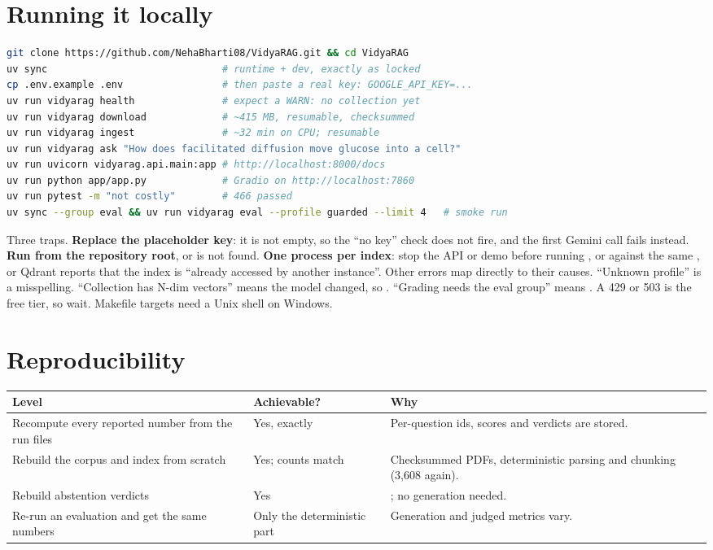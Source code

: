 \section{Running it locally}
\label{sec:setup}

\begin{lstlisting}[language=bash]
git clone https://github.com/NehaBharti08/VidyaRAG.git && cd VidyaRAG
uv sync                              # runtime + dev, exactly as locked
cp .env.example .env                 # then paste a real key: GOOGLE_API_KEY=...
uv run vidyarag health               # expect a WARN: no collection yet
uv run vidyarag download             # ~415 MB, resumable, checksummed
uv run vidyarag ingest               # ~32 min on CPU; resumable
uv run vidyarag ask "How does facilitated diffusion move glucose into a cell?"
uv run uvicorn vidyarag.api.main:app # http://localhost:8000/docs
uv run python app/app.py             # Gradio on http://localhost:7860
uv run pytest -m "not costly"        # 466 passed
uv sync --group eval && uv run vidyarag eval --profile guarded --limit 4   # smoke run
\end{lstlisting}

Three traps. \textbf{Replace the placeholder key}: it is not empty, so the ``no key'' check does not fire, and the first Gemini call fails instead. \textbf{Run from the repository root}, or  is not found. \textbf{One process per index}: stop the API or demo before running ,  or  against the same , or Qdrant reports that the index is ``already accessed by another instance''. Other errors map directly to their causes. ``Unknown profile'' is a misspelling. ``Collection has N-dim vectors'' means the model changed, so . ``Grading needs the eval group'' means . A 429 or 503 is the free tier, so wait. Makefile targets need a Unix shell on Windows.

\section{Reproducibility}
\label{sec:reproducibility}

\begin{center}\small
\begin{tabularx}{\textwidth}{@{}>{\raggedright\arraybackslash}p{5.8cm}>{\raggedright\arraybackslash}p{2.3cm}L@{}}
\toprule
\textbf{Level} & \textbf{Achievable?} & \textbf{Why}\\
\midrule
Recompute every reported number from the run files & Yes, exactly & Per-question ids, scores and verdicts are stored.\\
Rebuild the corpus and index from scratch & Yes; counts match & Checksummed PDFs, deterministic parsing and chunking (3,608 again).\\
Rebuild abstention verdicts & Yes & ; no generation needed.\\
Re-run an evaluation and get the same numbers & Only the deterministic part & Generation and judged metrics vary.\\
\bottomrule
\end{tabularx}
\end{center}

